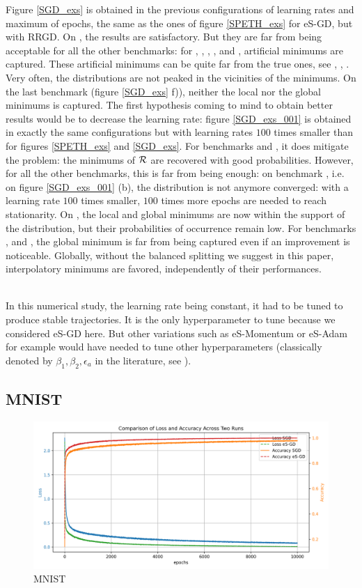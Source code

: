 \documentclass[article,authoryear,jmlmc]{beg_32}             %
\begin{document}
Figure \ref{SGD_exs} is obtained in the previous configurations of learning rates and maximum of epochs, the same as the ones of figure \ref{SPETH_exs} for eS-GD, but with RRGD. 
On \exTwo, the results are satisfactory. But they are far from being acceptable for all the other benchmarks: for \exOne, \exThree, \exFour, \exFive, \exSeven and \exHeight,
artificial minimums are captured. These artificial minimums can be quite far from the true ones, see \exFour, \exSeven, \exHeight.    
Very often, the distributions are not peaked in the vicinities of the minimums.
On the last benchmark (figure \ref{SGD_exs} f)), neither the local nor the global minimums is captured. 
The first hypothesis coming to mind to obtain better results would be to decrease the learning rate: figure \ref{SGD_exs_001} is obtained in exactly the same configurations but
with learning rates $100$ times smaller than for figures \ref{SPETH_exs} and \ref{SGD_exs}. 
For benchmarks \exOne and \exFour, it does mitigate the problem: the minimums of $\mathcal{R}$ are recovered with good probabilities. 
However, for all the other benchmarks, this is far from being enough: on benchmark \exTwo, i.e. on figure \ref{SGD_exs_001} (b), the distribution is not anymore
converged: with a  learning rate $100$ times smaller, $100$ times more epochs are needed to reach stationarity.
On \exThree, the local and global minimums are now within the support of the distribution, but their probabilities of occurrence remain low.
For benchmarks \exFive, \exSeven and \exHeight, the global minimum is far from being captured even if an improvement is noticeable. 
Globally, without the balanced splitting we suggest in this paper, interpolatory minimums are favored, independently of their performances.  

\ \\
In this numerical study, the learning rate being constant, it had to be tuned to produce stable trajectories. 
It is the only hyperparameter to tune because we considered eS-GD here. 
But other variations such as eS-Momentum or eS-Adam for example would have needed to tune other hyperparameters (classically denoted by $\beta_1,\beta_2, \epsilon_a$ in the literature, see
\cite{Bilel_thesis}). %

\subsection{MNIST}

\begin{figure}[!h]
  \includegraphics[width=0.8\linewidth]{chapitre5_img/comparison_plot.png}
  \caption{MNIST}
  \label{mnist}
\end{figure}
\end{document}
